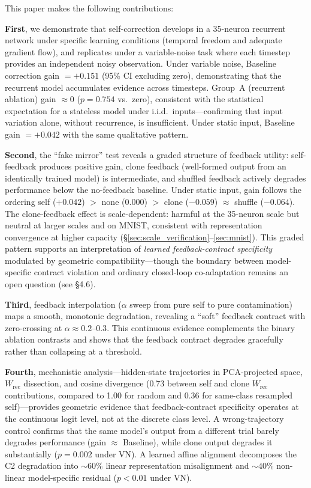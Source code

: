\documentclass[10pt]{article}
\begin{document}
This paper makes the following contributions:

\textbf{First}, we demonstrate that self-correction develops in a 35-neuron recurrent network under specific learning conditions (temporal freedom and adequate gradient flow), and replicates under a variable-noise task where each timestep provides an independent noisy observation. Under variable noise, Baseline correction gain $= +0.151$ (95\% CI excluding zero), demonstrating that the recurrent model accumulates evidence across timesteps. Group~A (recurrent ablation) gain $\approx 0$ ($p = 0.754$ vs.\ zero), consistent with the statistical expectation for a stateless model under i.i.d.\ inputs---confirming that input variation alone, without recurrence, is insufficient. Under static input, Baseline gain $= +0.042$ with the same qualitative pattern.

\textbf{Second}, the ``fake mirror'' test reveals a graded structure of feedback utility: self-feedback produces positive gain, clone feedback (well-formed output from an identically trained model) is intermediate, and shuffled feedback actively degrades performance below the no-feedback baseline. Under static input, gain follows the ordering self ($+0.042$) $>$ none ($0.000$) $>$ clone ($-0.059$) $\approx$ shuffle ($-0.064$). The clone-feedback effect is scale-dependent: harmful at the 35-neuron scale but neutral at larger scales and on MNIST, consistent with representation convergence at higher capacity (\S\ref{sec:scale_verification}--\ref{sec:mnist}). This graded pattern supports an interpretation of \emph{learned feedback-contract specificity} modulated by geometric compatibility---though the boundary between model-specific contract violation and ordinary closed-loop co-adaptation remains an open question (see \S4.6).

\textbf{Third}, feedback interpolation ($\alpha$ sweep from pure self to pure contamination) maps a smooth, monotonic degradation, revealing a ``soft'' feedback contract with zero-crossing at $\alpha \approx 0.2$--$0.3$. This continuous evidence complements the binary ablation contrasts and shows that the feedback contract degrades gracefully rather than collapsing at a threshold.

\textbf{Fourth}, mechanistic analysis---hidden-state trajectories in PCA-projected space, $W_\text{rec}$ dissection, and cosine divergence (0.73 between self and clone $W_\text{rec}$ contributions, compared to 1.00 for random and 0.36 for same-class resampled self)---provides geometric evidence that feedback-contract specificity operates at the continuous logit level, not at the discrete class level. A wrong-trajectory control confirms that the same model's output from a different trial barely degrades performance (gain $\approx$ Baseline), while clone output degrades it substantially ($p = 0.002$ under VN). A learned affine alignment decomposes the C2 degradation into ${\sim}60\%$ linear representation misalignment and ${\sim}40\%$ non-linear model-specific residual ($p < 0.01$ under VN).
\end{document}
